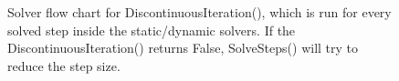 \begin{figure}[tbp]
  \caption{Solver flow chart for DiscontinuousIteration(), which is run for every solved step inside the static/dynamic solvers. If the DiscontinuousIteration() returns False, 
	SolveSteps() will try to reduce the step size.}
	\label{fig_solver_discontinuous_iteration}
\end{figure}

